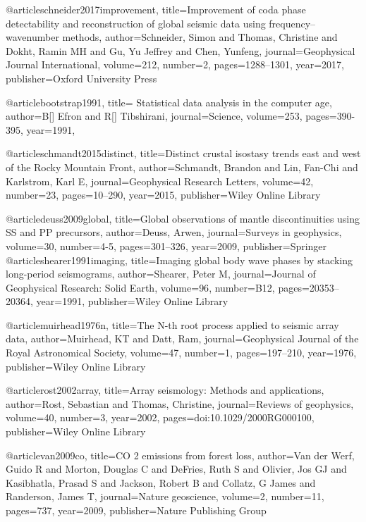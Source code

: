 @article{schneider2017improvement,
  title={Improvement of coda phase detectability and reconstruction of global seismic data using frequency--wavenumber methods},
  author={Schneider, Simon and Thomas, Christine and Dokht, Ramin MH and Gu, Yu Jeffrey and Chen, Yunfeng},
  journal={Geophysical Journal International},
  volume={212},
  number={2},
  pages={1288--1301},
  year={2017},
  publisher={Oxford University Press}
}

@article{bootstrap1991,
  title={ Statistical data analysis in the computer age},
  author={B[] Efron and R[] Tibshirani},
  journal={Science},
  volume={253},
  pages={390-395},
  year={1991},
}




@article{schmandt2015distinct,
  title={Distinct crustal isostasy trends east and west of the Rocky Mountain Front},
  author={Schmandt, Brandon and Lin, Fan-Chi and Karlstrom, Karl E},
  journal={Geophysical Research Letters},
  volume={42},
  number={23},
  pages={10--290},
  year={2015},
  publisher={Wiley Online Library}
}


@article{deuss2009global,
  title={Global observations of mantle discontinuities using SS and PP precursors},
  author={Deuss, Arwen},
  journal={Surveys in geophysics},
  volume={30},
  number={4-5},
  pages={301--326},
  year={2009},
  publisher={Springer}
}
@article{shearer1991imaging,
  title={Imaging global body wave phases by stacking long-period seismograms},
  author={Shearer, Peter M},
  journal={Journal of Geophysical Research: Solid Earth},
  volume={96},
  number={B12},
  pages={20353--20364},
  year={1991},
  publisher={Wiley Online Library}
}

@article{muirhead1976n,
  title={The N-th root process applied to seismic array data},
  author={Muirhead, KT and Datt, Ram},
  journal={Geophysical Journal of the Royal Astronomical Society},
  volume={47},
  number={1},
  pages={197--210},
  year={1976},
  publisher={Wiley Online Library}
}

@article{rost2002array,
  title={Array seismology: Methods and applications},
  author={Rost, Sebastian and Thomas, Christine},
  journal={Reviews of geophysics},
  volume={40},
  number={3},
  year={2002},
  pages={doi:10.1029/2000RG000100},
  publisher={Wiley Online Library}
}


@article{van2009co,
  title={CO 2 emissions from forest loss},
  author={Van der Werf, Guido R and Morton, Douglas C and DeFries, Ruth S and Olivier, Jos GJ and Kasibhatla, Prasad S and Jackson, Robert B and Collatz, G James and Randerson, James T},
  journal={Nature geoscience},
  volume={2},
  number={11},
  pages={737},
  year={2009},
  publisher={Nature Publishing Group}
}

